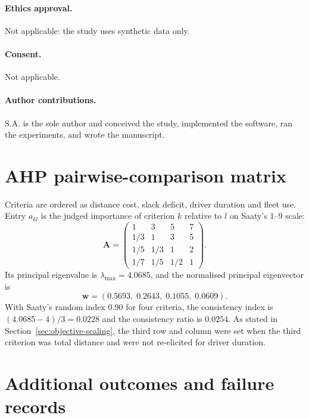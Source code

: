 \documentclass[11pt,a4paper]{article}
\begin{document}
\paragraph{Ethics approval.} Not applicable: the study uses synthetic data
only.

\paragraph{Consent.} Not applicable.

\paragraph{Author contributions.} S.A. is the sole author and conceived the
study, implemented the software, ran the experiments, and wrote the
manuscript.

\clearpage
\appendix
\section{AHP pairwise-comparison matrix}\label{sec:ahp-matrix}

Criteria are ordered as distance cost, slack deficit, driver duration and fleet
use. Entry $a_{kl}$ is the judged importance of criterion $k$ relative to $l$
on Saaty's 1--9 scale:
\[
\mathbf{A}=\begin{pmatrix}
1 & 3 & 5 & 7\\
1/3 & 1 & 3 & 5\\
1/5 & 1/3 & 1 & 2\\
1/7 & 1/5 & 1/2 & 1
\end{pmatrix}.
\]
Its principal eigenvalue is $\lambda_{\max}=4.0685$, and the normalised
principal eigenvector is
\[
\mathbf{w}=(0.5693,\;0.2643,\;0.1055,\;0.0609).
\]
With Saaty's random index 0.90 for four criteria, the consistency index is
$(4.0685-4)/3=0.0228$ and the consistency ratio is $0.0254$. As stated in Section~\ref{sec:objective-scaling},
the third row and column were set when the third criterion was total distance
and were not re-elicited for driver duration.

\section{Additional outcomes and failure records}\label{sec:additional}




\clearpage

\begingroup
\small



\endgroup
\end{document}

